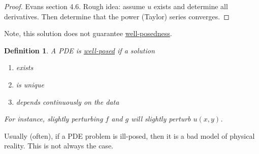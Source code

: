 \documentclass{article}
\newtheorem{definition}[theorem]{Definition}
\newtheorem{one minute paper}[theorem]{One Minute Paper}
\begin{document}
\begin{proof}
    Evans section 4.6. Rough idea: assume $u$ exists and determine all derivatives. Then determine that the power (Taylor) series converges. 
\end{proof}

Note, this solution does not guarantee \underline{well-posedness}. 

\begin{definition}
    A PDE is \underline{well-posed} if a solution
    \begin{enumerate}
        \item exists
        \item is unique 
        \item depends continuously on the data
    \end{enumerate}
    For instance, slightly perturbing $f$ and $g$ will slightly perturb $u(x,y)$. 
\end{definition}

Usually (often), if a PDE problem is ill-posed, then it is a bad model of physical reality. This is not always the case.
\end{document}
